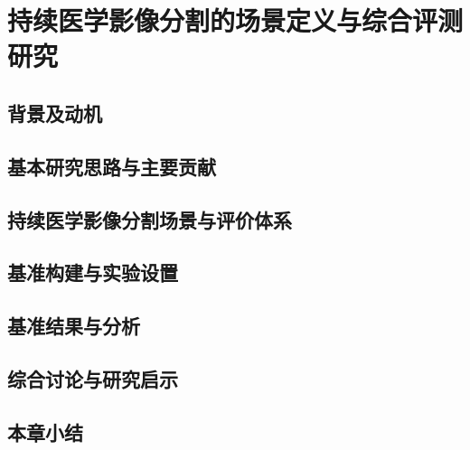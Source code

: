 \chapter{持续医学影像分割的场景定义与综合评测研究}
\label{chap:benchmark}

\section{背景及动机}
\section{基本研究思路与主要贡献}
\section{持续医学影像分割场景与评价体系}
\section{基准构建与实验设置}
\section{基准结果与分析}
\section{综合讨论与研究启示}
\section{本章小结}
